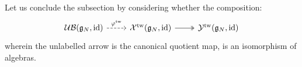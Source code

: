             Let us conclude the subsection by considering whether the composition:
                $$
                    \begin{tikzcd}
                    {\UB(\g_N, \id)} & {\calX^{\tw}(\g_N, \id)} & {\calY^{\tw}(\g_N, \id)}
                    \arrow["{\varphi^{\tw}}", dashed, from=1-1, to=1-2]
                    \arrow[two heads, from=1-2, to=1-3]
                    \end{tikzcd}
                $$
            wherein the unlabelled arrow is the canonical quotient map, is an isomorphism of algebras. 
    
    \printbibliography

